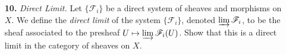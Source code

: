 \documentclass{article}
\newcommand{\fF}{\mathscr{F}}
\newcommand{\fG}{\mathscr{G}}
\newcommand\restr[2]{{%
  \left.\kern-\nulldelimiterspace %
  #1 %
  \vphantom{\big|} %
  \right|_{#2} %
}}
\begin{document}
\begin{enumerate} [label=\textbf{\arabic*.}, leftmargin=0em]
\begin{proof}
    Now we show $\fF \oplus \fG$ is a sheaf. Let $U$ be an open subset of $X$, and let $\{ V_i \}$ be a cover of $U$ by open sets. If $(s, t) \in \Gamma(U, \fF \oplus \fG)$, then $(\restr{s}{U_i}, \restr{t}{U_i}) = \restr{(s, t)}{U_i} = 0$ by universal property nonsense, so $s = 0$ and $t = 0$. Also, if we have elements $(s_i, t_i) \in \Gamma(V_i, \fF \oplus \fG)$ such that for all $i, j$, $\restr{(s_i, t_i)}{V_i \cap V_j} = \restr{(s_j, t_j)}{V_i \cap V_j}$, then again $(\restr{s_i}{U_i \cap U_j}, \restr{t_i}{U_i \cap U_j}) =(\restr{s_j}{U_i \cap U_j}, \restr{t_j}{U_i \cap U_j})$ if and only if $\restr{s_i}{U_i \cap U_j} = \restr{s_j}{U_i \cap U_j}$ and $\restr{t_i}{U_i \cap U_j} = \restr{t_j}{U_i \cap U_j}$, so by the sheaf properties of $\fF$ and $\fG$, there exists $s \in \Gamma(U, \fF)$ and $t \in \Gamma(U, \fG)$ such that $\restr{(s, t)}{U_i} = (s_i, t_i)$.
\end{proof}

\item[\textbf{10.}] \textit{Direct Limit.} Let $\{ \fF_i \}$ be a direct system of sheaves and morphisms on $X$. We define the \textit{direct limit} of the system $\{ \fF_i \}$, denoted $\varinjlim \fF_i$, to be the sheaf associated to the presheaf $U \mapsto \varinjlim \fF_i(U)$. Show that this is a direct limit in the category of sheaves on $X$.


\end{enumerate}
\end{document}
